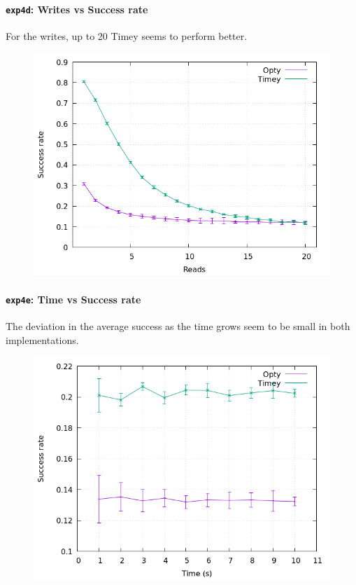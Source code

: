 \documentclass[a4paper, 11pt]{article}
\begin{document}
\paragraph{\texttt{exp4d}: Writes vs Success rate}

For the writes, up to 20 Timey seems to perform better.

\nopagebreak
\begin{figure}[H]
\centering
\includegraphics[width=.8\linewidth]{exp4/d/fig.png}
\end{figure}

\paragraph{\texttt{exp4e}: Time vs Success rate}

The deviation in the average success as the time grows seem to be small in both 
implementations.

\nopagebreak
\begin{figure}[H]
\centering
\includegraphics[width=.8\linewidth]{exp4/e/fig.png}
\end{figure}
\end{document}
